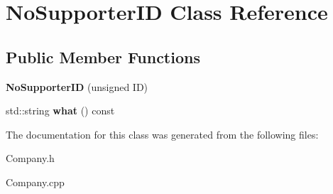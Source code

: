 \hypertarget{class_no_supporter_i_d}{}\section{No\+Supporter\+ID Class Reference}
\label{class_no_supporter_i_d}
\subsection*{Public Member Functions}
\begin{DoxyCompactItemize}
\item 
\mbox{\label{class_no_supporter_i_d_a0aae4bb93d024e4a31dfd67d3771b8c8}} 
{\bfseries No\+Supporter\+ID} (unsigned ID)
\item 
\mbox{\label{class_no_supporter_i_d_a4da6312928c4bac348c5e8e9f9e04d4f}} 
std\+::string {\bfseries what} () const
\end{DoxyCompactItemize}


The documentation for this class was generated from the following files\+:\begin{DoxyCompactItemize}
\item 
Company.\+h\item 
Company.\+cpp\end{DoxyCompactItemize}
